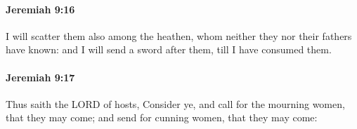 		\paragraph{Jeremiah 9:16} %
			\label{JEREMIAH-9-16}

			I will scatter them also among the heathen, whom neither they nor their fathers have known: and I will send a sword after them, till I have consumed them.


		\paragraph{Jeremiah 9:17} %
			\label{JEREMIAH-9-17}

			Thus saith the LORD of hosts, Consider ye, and call for the mourning women, that they may come; and send for cunning women, that they may come:


